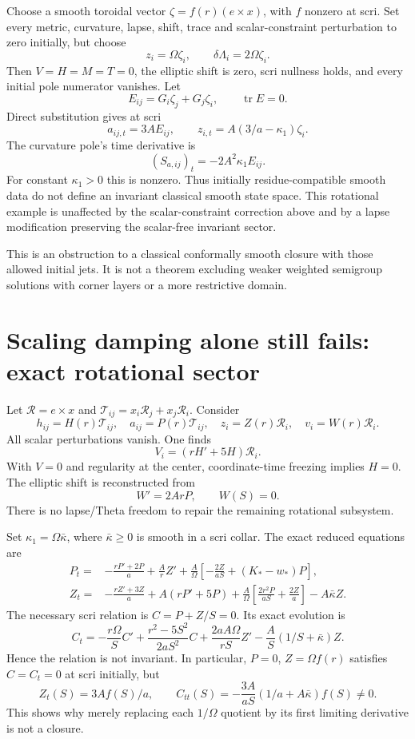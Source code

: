 \documentclass[11pt]{article}
\newcommand{\Tr}{\operatorname{tr}}
\begin{document}
Choose a smooth toroidal vector $\zeta=f(r)(e\times x)$, with $f$ nonzero at scri. Set every metric, curvature, lapse, shift, trace and scalar-constraint perturbation to zero initially, but choose
\[
z_i=\Omega\zeta_i,\qquad \delta\Lambda_i=2\Omega\zeta_i.
\]
Then $V=H=M=T=0$, the elliptic shift is zero, scri nullness holds, and every initial pole numerator vanishes. Let
\[
E_{ij}=G_i\zeta_j+G_j\zeta_i,\qquad \Tr E=0.
\]
Direct substitution gives at scri
\[
a_{ij,t}=3AE_{ij},\qquad
z_{i,t}=A(3/a-\kappa_1)\zeta_i.
\]
The curvature pole's time derivative is
\begin{equation}\boxed{
(S_{a,ij})_t=-2A^2\kappa_1 E_{ij}.
}\end{equation}
For constant $\kappa_1>0$ this is nonzero. Thus initially residue-compatible smooth data do not define an invariant classical smooth state space. This rotational example is unaffected by the scalar-constraint correction above and by a lapse modification preserving the scalar-free invariant sector.

This is an obstruction to a classical conformally smooth closure with those allowed initial jets. It is not a theorem excluding weaker weighted semigroup solutions with corner layers or a more restrictive domain.

\section{Scaling damping alone still fails: exact rotational sector}
Let $\mathcal R=e\times x$ and $\mathcal T_{ij}=x_i\mathcal R_j+x_j\mathcal R_i$. Consider
\[
h_{ij}=H(r)\mathcal T_{ij},\quad
a_{ij}=P(r)\mathcal T_{ij},\quad z_i=Z(r)\mathcal R_i,\quad
v_i=W(r)\mathcal R_i .
\]
All scalar perturbations vanish. One finds
\[
V_i=(rH'+5H)\mathcal R_i.
\]
With $V=0$ and regularity at the center, coordinate-time freezing implies $H=0$. The elliptic shift is reconstructed from
\[
W'=2ArP,\qquad W(S)=0.
\]
There is no lapse/Theta freedom to repair the remaining rotational subsystem.

Set $\kappa_1=\Omega\bar\kappa$, where $\bar\kappa\geq0$ is smooth in a scri collar. The exact reduced equations are
\begin{align}
P_t={}&-\frac{rP'+2P}{a}+\frac A r Z'
+\frac A\Omega\left[-\frac{2Z}{aS}+(K_*-w_*)P\right],\\
Z_t={}&-\frac{rZ'+3Z}{a}+A(rP'+5P)
+\frac A\Omega\left[\frac{2r^2P}{aS}+\frac{2Z}{a}\right]-A\bar\kappa Z .
\end{align}
The necessary scri relation is $C=P+Z/S=0$. Its exact evolution is
\[
C_t=-\frac{r\Omega}{S}C'
+\frac{r^2-5S^2}{2aS^2}C
+\frac{2aA\Omega}{rS}Z'
-\frac A S(1/S+\bar\kappa)Z .
\]
Hence the relation is not invariant. In particular, $P=0$, $Z=\Omega f(r)$ satisfies $C=C_t=0$ at scri initially, but
\[
Z_t(S)=3Af(S)/a,\qquad
C_{tt}(S)=-\frac{3A}{aS}(1/a+A\bar\kappa)f(S)\ne0.
\]
This shows why merely replacing each $1/\Omega$ quotient by its first limiting derivative is not a closure.
\end{document}
